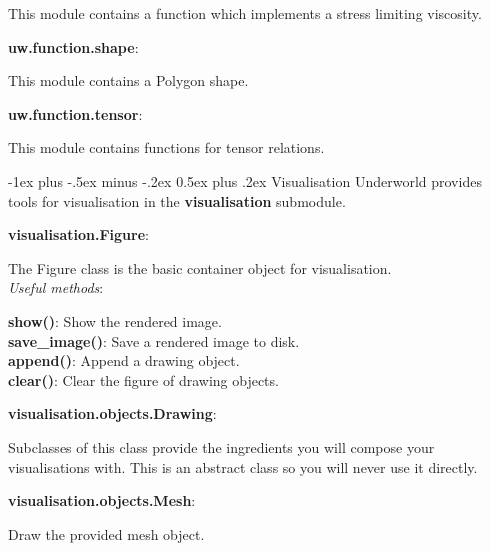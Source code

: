 \documentclass[10pt,landscape]{article}
\makeatletter
\renewcommand{\section}{\@startsection{section}{1}{0mm}%
                                {-1ex plus -.5ex minus -.2ex}%
                                {0.5ex plus .2ex}%
                                {\normalfont\large\bfseries}}
\makeatother
\begin{document}
\begin{multicols}{2}
\begin{addmargin}[1em]{2em}
This module contains a function which implements a stress limiting viscosity.
\end{addmargin}
\vspace{1mm}
\noindent\textbf{uw.function.shape}:
\begin{addmargin}[1em]{2em}
This module contains a Polygon shape.
\end{addmargin}
\vspace{1mm}
\noindent\textbf{uw.function.tensor}:
\begin{addmargin}[1em]{2em}
This module contains functions for tensor relations.
\end{addmargin}
\vspace{1mm}

\section{Visualisation}
Underworld provides tools for visualisation in the \textbf{visualisation} submodule.
\vspace{1mm}

\noindent\textbf{visualisation.Figure}:
\begin{addmargin}[1em]{2em}
The Figure class is the basic container object for visualisation.\\
\vspace{1mm}
\textit{Useful methods}:\\
\begin{addmargin}[1em]{2em}
\textbf{show()}: Show the rendered image.\\
\textbf{save\_image()}: Save a rendered image to disk.\\
\textbf{append()}: Append a drawing object.\\
\textbf{clear()}: Clear the figure of drawing objects.\\
\end{addmargin}
\end{addmargin}

\vspace{1mm}

\noindent\textbf{visualisation.objects.Drawing}:
\begin{addmargin}[1em]{2em}
Subclasses of this class provide the ingredients you will compose your visualisations with.
This is an abstract class so you will never use it directly.
\end{addmargin}

\noindent\textbf{visualisation.objects.Mesh}:
\begin{addmargin}[1em]{2em}
Draw the provided mesh object.
\end{addmargin}


\end{multicols}
\end{document}
